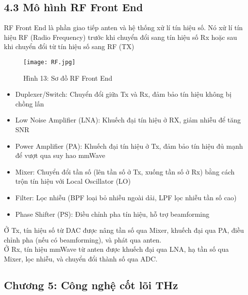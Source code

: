 \documentclass[a4paper,13pt]{article}
\begin{document}
\subsection{4.3 Mô hình RF Front End}
RF Front End là phần giao tiếp anten và hệ thống xử lí tín hiệu số. Nó xử lí tín hiệu RF (Radio Frequency) trước khi chuyển đổi sang tín hiệu số Rx hoặc sau khi chuyển đổi từ tín hiệu số sang RF (TX)
\begin{figure}[htbp]
    \centering
    \texttt{[image: RF.jpg]}
    \caption*{Hình 13: Sơ đồ RF Front End \cite{key8} }
    \label{fig:model}
\end{figure}
\begin{itemize}
\item Duplexer/Switch: Chuyển đổi giữa Tx và Rx, đảm bảo tín hiệu không bị chồng lấn
\item Low Noise Amplifier (LNA): Khuếch đại tín hiệu ở RX, giảm nhiễu để tăng SNR
\item Power Amplifier (PA): Khuếch đại tín hiệu ở Tx, đảm bảo tín hiệu đủ mạnh để vượt qua suy hao mmWave
\item Mixer: Chuyển đổi tần số (lên tần số ở Tx, xuống tần số ở Rx) bằng cách trộn tín hiệu với Local Oscillator (LO)
\item Filter: Lọc nhiễu (BPF loại bỏ nhiễu ngoài dải, LPF lọc nhiễu tần số cao)
\item Phase Shifter (PS): Điều chỉnh pha tín hiệu, hỗ trợ beamforming
\end{itemize}
Ở Tx, tín hiệu số từ DAC được nâng tần số qua Mixer, khuếch đại qua PA, điều chỉnh pha (nếu có beamforming), và phát qua anten. \\
Ở Rx, tín hiệu mmWave từ anten được khuếch đại qua LNA, hạ tần số qua Mixer, lọc nhiễu, và chuyển đổi thành số qua ADC.
\begin{center}
   \section{Chương 5: Công nghệ cốt lõi THz} 
\end{center}
\end{document}
